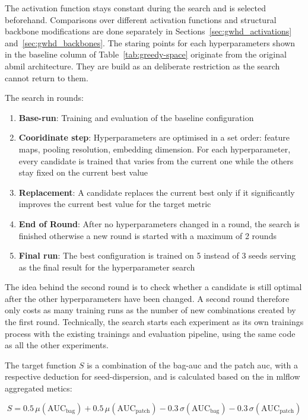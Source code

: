 \documentclass[12pt,parskip = half, DIV=classic,listof=totoc]{scrartcl}
\begin{document}
			The activation function stays constant during the search and is selected beforehand. Comparisons over different activation functions and 
			structural backbone modifications are done separately in Sections~\ref{sec:gwhd_activations} and~\ref{sec:gwhd_backbones}. 
			The staring points for each hyperparameters shown in the baseline column of Table~\ref{tab:greedy-space} originate from
			the original \ac{abmil} architecture. They are build as an deliberate restriction as the search cannot return to them.

			The search in rounds:
			\begin{enumerate}
				\item \textbf{Base-run}: Training and evaluation of the baseline configuration
				\item \textbf{Cooridinate step}: Hyperparameters are optimised in a set order: feature maps, pooling resolution, embedding dimension. 
				       For each hyperparameter, every candidate is trained that varies from the current one while the others stay fixed on the current best value
				\item \textbf{Replacement}: A candidate replaces the current best only if it significantly improves the current best value for the target metric
				\item \textbf{End of Round}: After no hyperparameters changed in a round, the search is finished otherwise a new round is started with a maximum of 2 rounds
				\item \textbf{Final run}: The best configuration is trained on 5 instead of 3 seeds serving as the final result for the hyperparameter search
			\end{enumerate}

			The idea behind the second round is to check whether a candidate is still optimal after the other hyperparameters have been changed. A second round 
			therefore only costs as many training runs as the number of new combinations created by the first round. Technically, the search starts each experiment as its own trainings process with the existing trainings and evaluation pipeline, using the same code
			as all the other experiments. 
			
			The target function $S$ is a combination of the bag-\acs*{auc} and the patch \ac{auc}, with a respective deduction for seed-dispersion, 
			and is calculated based on the in mlflow aggregated metics:

			\begin{equation}
				S = 0.5\,\mu\!\left(\mathrm{AUC}_{\mathrm{bag}}\right)
					+ 0.5\,\mu\!\left(\mathrm{AUC}_{\mathrm{patch}}\right)
					- 0.3\,\sigma\!\left(\mathrm{AUC}_{\mathrm{bag}}\right)
					- 0.3\,\sigma\!\left(\mathrm{AUC}_{\mathrm{patch}}\right)
			\end{equation}
			
\end{document}
